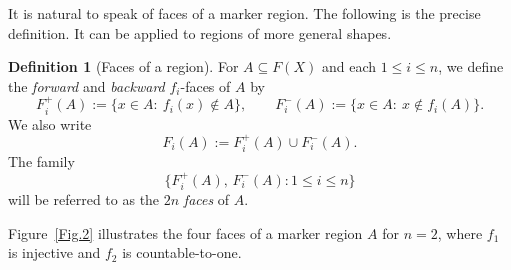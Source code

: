 \documentclass[11pt, reqno, a4paper]{amsart}
\theoremstyle{definition}
\newtheorem{definition}[theorem]{Definition}
\theoremstyle{plain}
\begin{document}
It is natural to speak of faces of a marker region. The following is the precise definition. It can be applied to regions of more general shapes.

\begin{definition}[Faces of a region]\label{def:faces}
For $A\subseteq F(X)$ and each $1\le i\le n$, we define the \emph{forward} and \emph{backward} $f_i$-faces of $A$ by
$$
F_i^+(A):=\{x\in A:\ f_i(x)\notin A\},
\qquad
F_i^-(A):=\{x\in A:\ x\notin f_i(A)\}.
$$
We also write
$$
F_i(A):=F_i^+(A)\cup F_i^-(A).
$$
The family
$$
\{F_i^+(A),\,F_i^-(A):1\le i\le n\}
$$
will be referred to as the $2n$ \emph{faces} of $A$.
\end{definition}

Figure~\ref{Fig.2} illustrates the four faces of a marker region $A$ for $n=2$, where $f_1$ is injective and $f_2$ is
countable-to-one.
\end{document}
